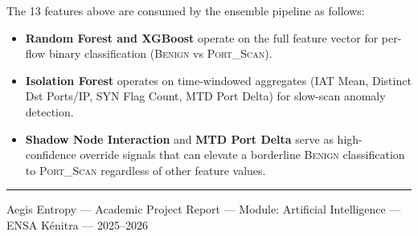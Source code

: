 \documentclass[12pt,a4paper]{report}
\begin{document}
The 13 features above are consumed by the ensemble pipeline as follows:

\begin{itemize}[nosep, leftmargin=1.5em]
  \item \textbf{Random Forest and XGBoost} operate on the full feature vector for
        per-flow binary classification (\textsc{Benign} vs \textsc{Port\_Scan}).
  \item \textbf{Isolation Forest} operates on time-windowed aggregates (IAT Mean,
        Distinct Dst Ports/IP, SYN Flag Count, MTD Port Delta) for slow-scan anomaly
        detection.
  \item \textbf{Shadow Node Interaction} and \textbf{MTD Port Delta} serve as
        high-confidence override signals that can elevate a borderline
        \textsc{Benign} classification to \textsc{Port\_Scan} regardless of other feature
        values.
\end{itemize}

\vspace{2em}
\noindent\rule{\linewidth}{0.4pt}
\begin{center}
  \small Aegis Entropy --- Academic Project Report ---
  Module: Artificial Intelligence --- ENSA K\'{e}nitra --- 2025--2026
\end{center}
\end{document}
